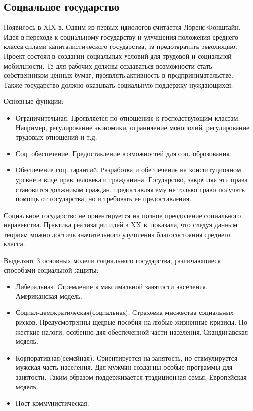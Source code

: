 \subsection{Социальное государство}
Появилось в XIX в. Одним из первых идиологов считается Лоренс Фонштайн. Идея в переходе к социальному государству и улучшения положения среднего класса силами капиталистического государства, те предотвратить революцию. Проект состоял в создании социальных условий для трудовой и социальной мобильности. Те для рабочих должны создаваться возможности стать собственником ценных бумаг, проявлять активность в предпринимательстве. Также государство должно оказывать социальную поддержку нуждающихся.

Основные функции:
\begin{itemize}
	\item Ограничительная. Проявляется по отношению к господствующим классам. Например, регулирование экономики, ограничение монополий, регулирование трудовых отношений и т.д.
	\item Соц. обеспечение. Предоставление возможностей для соц. оброзования.
	\item Обеспечение соц. гарантий. Разработка и обеспечение на конституционном уровне в виде прав человека и гражданина. Государство, закрепляя эти права становится должником граждан, предоставляя ему не только право получать помощь от государства, но и требовать ее предоставления.
\end{itemize}
Социальное государство не ориентируется на полное преодоление социального неравенства. Практика реализации идей в XX в. показала, что следуя данным теориям можно достичь значительного улучшения благосостояния среднего класса.

Выделяют 3 основных модели социального государства, различающиеся способами социальной защиты:
\begin{itemize}
	\item Либеральная. Стремление к максимальной занятости населения. Американская модель.
	\item Социал-демократическая(социальная). Страховка множества социальных рисков. Предусмотренны щедрые пособия на любые жизненные кризисы. Но жесткие налоги, особенно для обеспеченной части населения. Скандинавская модель.
	\item Корпоративная(семейная). Ориентируется на занятость, но стимулируется мужская часть населения. Для мужчин созданны особые программы для занятости. Таким образом поддерживается традиционная семья. Европейская модель.
	\item Пост-коммунистическая. 
\end{itemize}

